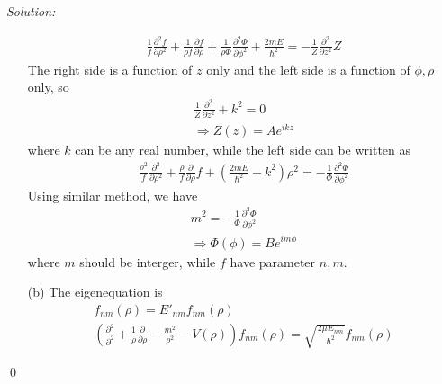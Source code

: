 \documentclass[10pt,a4paper]{article}
\newenvironment{sol}
    {\emph{Solution:}
    }
    {
    \qed
    }
\begin{document}
\begin{sol}
\begin{itemize}
\begin{gather}
\frac{1}{f}\frac{\partial^2f}{\partial\rho^2}+\frac{1}{\rho f}\frac{\partial f}{\partial\rho}+\frac{1}{\rho\Phi}\frac{\partial^2\Phi}{\partial\phi^2}+\frac{2mE}{\hbar^2}=-\frac{1}{Z}\frac{\partial^2}{\partial z^2}Z
\end{gather}
The right side is a function of $z$ only and the left side is a function of $\phi,\rho$ only, so
\begin{gather}
\frac{1}{Z}\frac{\partial^2}{\partial z^2}+k^2=0\\
\Longrightarrow Z(z)=Ae^{ikz}
\end{gather}
where $k$ can be any real number, while the left side can be written as
\begin{gather}
\frac{\rho^2}{f}\frac{\partial^2}{\partial\rho^2}+\frac{\rho}{f}\frac{\partial}{\partial\rho}f+(\frac{2mE}{\hbar^2}-k^2)\rho^2=-\frac{1}{\Phi}\frac{\partial^2\Phi}{\partial\phi^2}
\end{gather}
Using similar method, we have
\begin{gather}
m^2=-\frac{1}{\Phi}\frac{\partial^2\Phi}{\partial\phi^2}\\
\Longrightarrow\Phi(\phi)=Be^{im\phi}
\end{gather}
where $m$ should be interger, while $f$ have parameter $n,m$.
\item[(b)] The eigenequation is
\begin{gather}
[-\frac{\hbar^2}{2\mu}(\frac{\partial^2}{\partial^2\rho}+\frac{1}{\rho}\frac{\partial}{\partial\rho})+\frac{\hbar^2m^2}{2\mu\rho^2}+\frac{\hbar^2V(\rho)}{\mu}]f_{nm}(\rho)=E'_{nm}f_{nm}(\rho)\\
(\frac{\partial^2}{\partial^2}+\frac{1}{\rho}\frac{\partial}{\partial\rho}-\frac{m^2}{\rho^2}-V(\rho))f_{nm}(\rho)=\sqrt{\frac{2\mu E_{nm}}{\hbar^2}}f_{nm}(\rho)
\end{gather}
\end{itemize}
\end{sol}
\end{document}
